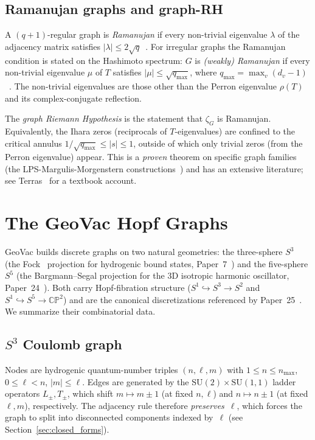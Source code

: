 \documentclass[11pt]{article}
\begin{document}
\subsection{Ramanujan graphs and graph-RH}

A $(q{+}1)$-regular graph is \emph{Ramanujan} if every non-trivial
eigenvalue $\lambda$ of the adjacency matrix satisfies
$|\lambda|\le 2\sqrt{q}$~\cite{lps1988,morgenstern1994}.  For irregular
graphs the Ramanujan condition is stated on the Hashimoto
spectrum: $G$ is \emph{(weakly) Ramanujan} if every non-trivial
eigenvalue $\mu$ of $T$ satisfies $|\mu|\le\sqrt{q_{\max}}$, where
$q_{\max} = \max_v(d_v - 1)$~\cite{kotani2000,terras2010}.
The non-trivial eigenvalues are those other than the Perron eigenvalue
$\rho(T)$ and its complex-conjugate reflection.

The \emph{graph Riemann Hypothesis} is the statement that $\zeta_G$ is
Ramanujan.  Equivalently, the Ihara zeros (reciprocals of $T$-eigenvalues)
are confined to the critical annulus
$1/\sqrt{q_{\max}} \le |s| \le 1$, outside of which only trivial zeros
(from the Perron eigenvalue) appear.  This is a \emph{proven}
theorem on specific graph families (the LPS-Margulis-Morgenstern
constructions~\cite{lps1988,morgenstern1994}) and has an extensive
literature; see Terras~\cite{terras2010} for a textbook account.

\section{The GeoVac Hopf Graphs}
\label{sec:graphs}

GeoVac builds discrete graphs on two natural geometries: the
three-sphere $S^3$ (the Fock~\cite{fock1935} projection for hydrogenic
bound states, Paper~7~\cite{paper7}) and the five-sphere $S^5$ (the
Bargmann--Segal projection for the 3D isotropic harmonic oscillator,
Paper~24~\cite{paper24}).  Both carry Hopf-fibration structure
($S^1\hookrightarrow S^3\to S^2$ and $S^1\hookrightarrow S^5\to
\mathbb{CP}^2$) and are the canonical discretizations referenced by
Paper~25~\cite{paper25}.  We summarize their combinatorial data.

\subsection{$S^3$ Coulomb graph}

Nodes are hydrogenic quantum-number triples $(n,\ell,m)$ with
$1\le n\le n_{\max}$, $0\le\ell<n$, $|m|\le\ell$.  Edges are generated
by the $\mathrm{SU}(2)\times\mathrm{SU}(1,1)$ ladder operators
$L_\pm, T_\pm$, which shift $m\mapsto m\pm 1$ (at fixed $n,\ell$) and
$n\mapsto n\pm 1$ (at fixed $\ell,m$), respectively.  The adjacency
rule therefore \emph{preserves}~$\ell$, which forces the graph to split
into disconnected components indexed by~$\ell$ (see
Section~\ref{sec:closed_forms}).
\end{document}

